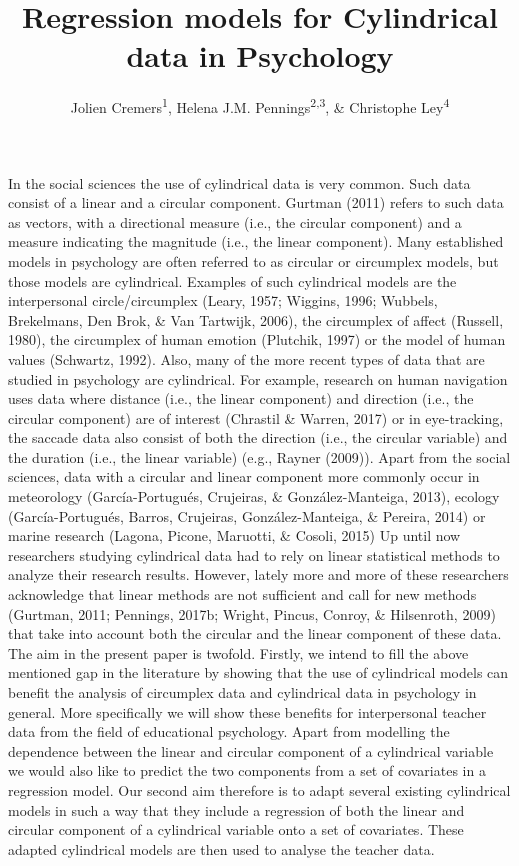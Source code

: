 \documentclass[man,mask]{apa6}
\title{Regression models for Cylindrical data in Psychology}
\author{Jolien Cremers\textsuperscript{1}, Helena J.M. Pennings\textsuperscript{2,3}, \& Christophe Ley\textsuperscript{4}}
\date{}
\affiliation{
\vspace{0.5cm}
\textsuperscript{1} Department of Biostatistics, University of Copenhagen\\\textsuperscript{2} TNO\\\textsuperscript{3} Department of Education, Utrecht University\\\textsuperscript{4} Department of Applied Mathematics, Computer Science and Statistics, Ghent University}
\DeclareRobustCommand{\VAN}[3]{#2}
\DeclareRobustCommand{\DEN}[3]{#2}
\begin{document}
\maketitle

In the social sciences the use of cylindrical data is very common. Such data
consist of a linear and a circular component. Gurtman (2011) refers to
such data as vectors, with a directional measure (i.e., the circular component)
and a measure indicating the magnitude (i.e., the linear component). Many
established models in psychology are often referred to as circular or circumplex
models, but those models are cylindrical. Examples of such cylindrical models
are the interpersonal circle/circumplex
(Leary, 1957; Wiggins, 1996; Wubbels, Brekelmans, \DEN{Brok}{Den}{den} Brok, \& \VAN{Tartwijk}{Van}{van} Tartwijk, 2006), the circumplex of
affect (Russell, 1980), the circumplex of human emotion
(Plutchik, 1997) or the model of human values (Schwartz, 1992).
\newline
\indent Also, many of the more recent types of data that are studied in
psychology are cylindrical. For example, research on human navigation uses data
where distance (i.e., the linear component) and direction (i.e., the circular
component) are of interest (Chrastil \& Warren, 2017) or in eye-tracking, the
saccade data also consist of both the direction (i.e., the circular variable)
and the duration (i.e., the linear variable) (e.g., Rayner (2009)). Apart from
the social sciences, data with a circular and linear component more commonly
occur in meteorology (García-Portugués, Crujeiras, \& González-Manteiga, 2013), ecology (García-Portugués, Barros, Crujeiras, González-Manteiga, \& Pereira, 2014) or marine
research (Lagona, Picone, Maruotti, \& Cosoli, 2015) \newline
\indent Up until now researchers studying cylindrical data had to rely on linear
statistical methods to analyze their research results. However, lately more and
more of these researchers acknowledge that linear methods are not sufficient and
call for new methods (Gurtman, 2011; Pennings, 2017b; Wright, Pincus, Conroy, \& Hilsenroth, 2009) that take into account both the circular and the linear
component of these data.
\newline
\indent The aim in the present paper is twofold. Firstly, we intend to fill the
above mentioned gap in the literature by showing that the use of cylindrical
models can benefit the analysis of circumplex data and cylindrical data in
psychology in general. More specifically we will show these benefits for
interpersonal teacher data from the field of educational psychology. Apart from
modelling the dependence between the linear and circular component of a
cylindrical variable we would also like to predict the two components from a set
of covariates in a regression model. Our second aim therefore is to adapt
several existing cylindrical models in such a way that they include a regression
of both the linear and circular component of a cylindrical variable onto a set
of covariates. These adapted cylindrical models are then used to analyse the
teacher data.
\end{document}
